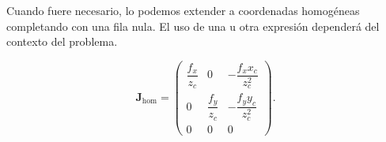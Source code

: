 Cuando fuere necesario, lo podemos extender a coordenadas homogéneas completando con una fila nula. El uso de una u otra expresión dependerá del contexto del problema.

\begin{equation}
\mathbf{J}_{\mathrm{hom}}
=
\begin{pmatrix}
\dfrac{f_x}{z_c} & 0 & -\dfrac{f_x x_c}{z_c^2} \\
0 & \dfrac{f_y}{z_c} & -\dfrac{f_y y_c}{z_c^2} \\
0 & 0 & 0
\end{pmatrix}.
\end{equation}